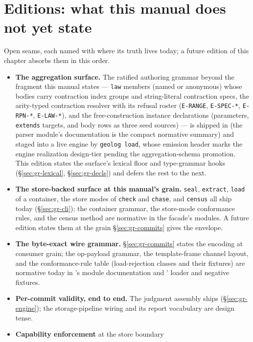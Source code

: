 \section{Editions: what this manual does not yet state}
\label{sec:gr-editions}

Open seams, each named with where its truth lives today; a future
edition of this chapter absorbs them in this order.

\begin{itemize}
\item \textbf{The aggregation surface.} The ratified authoring
grammar beyond the fragment this manual states — \texttt{law}
members (named or anonymous) whose bodies carry contraction index
groups and string-literal contraction specs, the arity-typed
contraction resolver with its refusal roster
(\texttt{E-RANGE}, \texttt{E-SPEC-*}, \texttt{E-RPN-*},
\texttt{E-LAW-*}), and the free-construction instance declarations
(parameters, \texttt{extends} targets, and body rows as three seed
sources) — is shipped in  (the parser
module's documentation is the compact normative summary) and staged
into a live engine by \texttt{geolog load}, whose emission header
marks the engine realization design-tier pending the
aggregation-schema promotion. This edition states the surface's
lexical floor and type-grammar hooks (\S\ref{sec:gr-lexical},
\S\ref{sec:gr-decls}) and defers the rest to the next.
\item \textbf{The store-backed surface at this manual's grain.}
\texttt{seal}, \texttt{extract}, \texttt{load} of a 
container, the store modes of \texttt{check} and \texttt{chase}, and
\texttt{census} all ship today (\S\ref{sec:gr-cli}); the container
grammar, the store-mode conformance rules, and the census method are
normative in the facade's modules. A future edition states them at
the grain \S\ref{sec:gr-commits} gives the envelope.
\item \textbf{The byte-exact wire grammar.} \S\ref{sec:gr-commits}
states the encoding at consumer grain; the op-payload grammar, the
template-frame channel layout, and the conformance-rule table
(load-rejection classes and their fixtures) are normative today in
's module documentation and
' loader and negative fixtures.
\item \textbf{Per-commit validity, end to end.} The judgment
assembly ships (\S\ref{sec:gr-engine}); the storage-pipeline wiring
and its report vocabulary are design tense.
\item \textbf{Capability enforcement} at the store boundary

\end{itemize}
